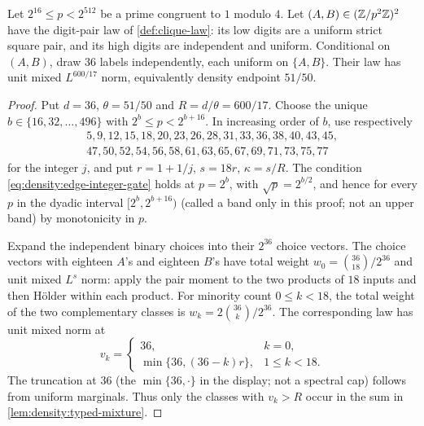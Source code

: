 \begin{lemma}\label{lem:density:clique36}
Let $2^{16}\le p<2^{512}$ be a prime congruent to $1$ modulo $4$.
Let $(A,B)\in(\mathbb Z/p^2\mathbb Z)^2$ have the digit-pair law of
\cref{def:clique-law}: its low digits are a uniform strict square pair,
and its high digits are independent and uniform. Conditional on $(A,B)$,
draw $36$ labels independently, each uniform on $\{A,B\}$. Their law has
unit mixed $L^{600/17}$ norm, equivalently density endpoint $51/50$.
\end{lemma}
\begin{proof}
Put $d=36$, $\theta=51/50$ and $R=d/\theta=600/17$. Choose the unique
$b\in\{16,32,\ldots,496\}$ with $2^b\le p<2^{b+16}$. In increasing order
of $b$, use respectively
\[
\begin{gathered}
 5,9,12,15,18,20,23,26,28,31,33,36,38,40,43,45,\\
 47,50,52,54,56,58,61,63,65,67,69,71,73,75,77
\end{gathered}
\]
for the integer $j$, and put $r=1+1/j$, $s=18r$, $\kappa=s/R$.
The condition \eqref{eq:density:edge-integer-gate} holds at $p=2^b$, with
$\sqrt p=2^{b/2}$, and hence for every $p$ in the dyadic
interval $[2^b,2^{b+16})$ (called a band only in this proof; not
an upper band) by monotonicity in $p$.

Expand the independent binary choices into their $2^{36}$ choice vectors.
The choice vectors with eighteen $A$'s and eighteen $B$'s have total weight $w_0=\binom{36}{18}/2^{36}$ and
unit mixed $L^s$ norm: apply the pair moment to the two products of
$18$ inputs and then H\"older within each product. For minority count
$0\le k<18$, the total weight of the two complementary classes is
$w_k=2\binom{36}{k}/2^{36}$. The corresponding law has unit mixed norm at
\[
 v_k=\begin{cases}
 36,&k=0,\\
 \min\{36,(36-k)r\},&1\le k<18.
 \end{cases}
\]
The truncation at $36$ (the $\min\{36,\cdot\}$ in the display;
not a spectral cap) follows from uniform marginals. Thus only the classes with $v_k>R$ occur in the sum in \cref{lem:density:typed-mixture}.


\end{proof}
